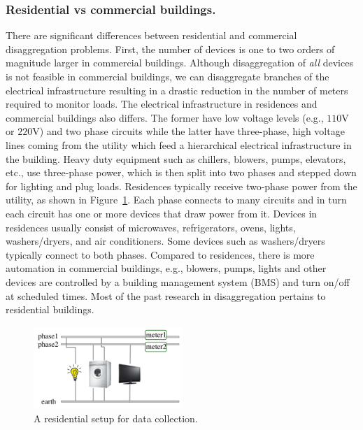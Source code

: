 \subsubsection*{Residential vs commercial buildings.}
There are significant differences between residential and commercial
disaggregation problems. First, the number of devices is one to two orders of
magnitude larger in commercial buildings. Although disaggregation of {\em all}
devices is not feasible in commercial buildings, we can disaggregate branches
of the electrical infrastructure resulting in a drastic reduction in the number
of meters required to monitor loads.
The electrical infrastructure in residences and commercial
buildings also differs.
The former have low voltage levels (e.g., $110$V or $220$V) and two phase
circuits while the latter have three-phase, high voltage lines
coming from the utility which feed a hierarchical electrical infrastructure in
the building. Heavy duty equipment such as chillers, blowers, pumps, elevators,
etc., use three-phase power, which is then split into two phases and stepped
down for lighting and plug loads. Residences typically receive
two-phase power from the utility, as shown in Figure~\ref{fig_bg}. Each
phase connects to many circuits and in turn each circuit has one or more
devices that draw power from it.
Devices in residences  usually consist of
microwaves, refrigerators, ovens, lights, washers/dryers,
and air conditioners.
Some devices such as washers/dryers
typically connect to both phases.
Compared to residences, there is more automation in commercial buildings,
e.g., blowers, pumps, lights and other devices are controlled by a building
management system (BMS) and turn on/off at scheduled times. Most of the past
research in disaggregation pertains to residential buildings.

\begin{figure}[!hbp]
\centering
\includegraphics[width=0.5\textwidth]{disaggfigs/background.pdf}
\caption{A residential setup for data collection.}
\label{fig_bg}
\end{figure}

